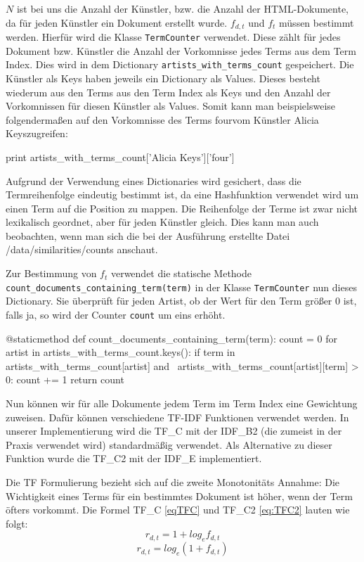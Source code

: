 \documentclass[prodmode,acmtecs]{acmsmall} %
\begin{document}
$N$ ist bei uns die Anzahl der Künstler, bzw. die Anzahl der HTML-Dokumente, da für jeden Künstler ein Dokument erstellt wurde. $f_{d,t}$ und $f_t$ müssen bestimmt werden. Hierfür wird die Klasse \texttt{TermCounter} verwendet. Diese zählt für jedes Dokument bzw. Künstler die Anzahl der  Vorkomnisse jedes Terms aus dem Term Index. Dies wird in dem Dictionary \texttt{artists\_with\_terms\_count} gespeichert. Die Künstler als Keys haben jeweils ein Dictionary als Values. Dieses besteht wiederum aus den Terms aus den Term Index als Keys und den Anzahl der Vorkomnissen für diesen Künstler als Values. 
Somit kann man beispielsweise folgendermaßen auf den Vorkomnisse des Terms \glqq four\grqq vom Künstler \glqq Alicia Keys\grqq zugreifen:
\begin{python}
    print artists_with_terms_count['Alicia Keys']['four']
\end{python}
Aufgrund der Verwendung eines Dictionaries wird gesichert, dass die Termreihenfolge eindeutig bestimmt ist, da eine Hashfunktion verwendet wird um einen Term auf die Position zu mappen. Die Reihenfolge der Terme ist zwar nicht lexikalisch geordnet, aber für jeden Künstler gleich. Dies kann man auch beobachten, wenn man sich die bei der Ausführung erstellte Datei /data/similarities/counts anschaut.

Zur Bestimmung von $f_t$ verwendet die statische Methode \texttt{count\_documents\_containing\_term(term)} in der Klasse \texttt{TermCounter} nun dieses Dictionary. Sie überprüft für jeden Artist, ob der Wert für den Term größer 0 ist, falls ja, so wird der Counter \texttt{count} um eins erhöht.
\begin{python}
    @staticmethod
    def count_documents_containing_term(term):
        count = 0
        for artist in artists_with_terms_count.keys():
            if term in artists_with_terms_count[artist] and \ 		       artists_with_terms_count[artist][term] > 0:
                count += 1
        return count
\end{python}       

Nun können wir für alle Dokumente jedem Term im Term Index eine Gewichtung zuweisen. Dafür können verschiedene TF-IDF Funktionen verwendet werden. In unserer Implementierung wird die TF\_C mit der IDF\_B2 (die zumeist in der Praxis verwendet wird) standardmäßig verwendet. Als Alternative zu dieser Funktion wurde die TF\_C2 mit der IDF\_E implementiert. 

Die TF Formulierung bezieht sich auf die zweite Monotonitäts Annahme: Die Wichtigkeit eines Terms für ein bestimmtes Dokument ist höher, wenn der Term öfters vorkommt.
Die Formel TF\_C \eqref{eqTFC} und TF\_C2 \eqref{eq:TFC2} lauten wie folgt:
\begin{equation}\label{eqTFC}
  r_{d,t} = 1 + log_{e} f_{d,t}
\end{equation}
\begin{equation}\label{eq:TFC2}
  r_{d,t} = log_{e} (1 + f_{d,t})
\end{equation}
\end{document}
